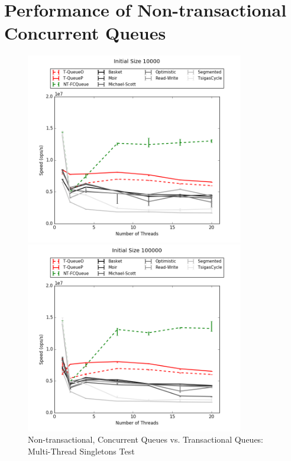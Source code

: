 \section{Performance of Non-transactional Concurrent Queues}
\begin{figure}[H]
    \centering
    \includegraphics[width=0.85\textwidth]{concurrent/allQ:RandSingleOps10000.png}
    
    \vspace{12pt}
    \includegraphics[width=0.85\textwidth]{concurrent/allQ:RandSingleOps100000.png}
    \caption{Non-transactional, Concurrent Queues vs. Transactional Queues: Multi-Thread Singletons Test}
\end{figure}
